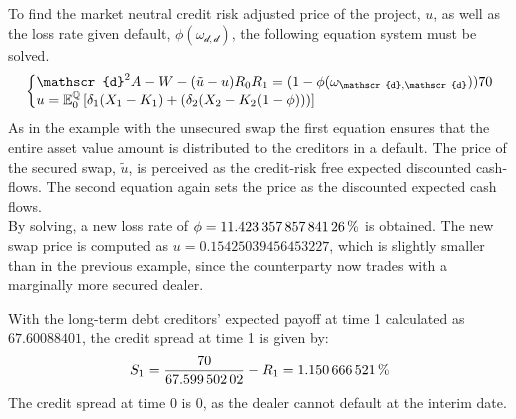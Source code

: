 \documentclass[main.tex]{subfiles}
\begin{document}
            To find the market neutral credit risk adjusted price of the project, $u$, 
            as well as the loss rate given default, $\phi(\omega_{\mathscr{d},\mathscr{d}})$,
            the following equation system must be solved.
            \begin{equation}
                \left\{\begin{array}{@{}l@{}}
                    \mathscr{d}^{2} A - W - (\tilde{u}-u)R_{0}R_{1}
                    =
                    (1-\phi(\omega_{\mathscr{d},\mathscr{d}}))\num{70}
                    \\
                    u =
                    \mathbb{E}_{0}^{\rnmeasure}\left[
                        \delta_{1}(X_1-K_1)+(\delta_{2}(X_2-K_2(1-\phi)))
                    \right]
                \end{array}\right.
            \end{equation}
            As in the example with the unsecured swap the first equation ensures
            that the entire asset value amount is distributed to the creditors in a default.
            The price of the secured swap, $\tilde{u}$, is perceived as the credit-risk free expected discounted cash-flows.
            The second equation again sets the price as the discounted expected cash flows.
            \\
            By solving, a new loss rate of $\phi = \pct{0.11423357857841265}$ is obtained.
            The new swap price is computed as $u=\num{0.15425039456453227}$,
            which is slightly smaller than in the previous example,
            since the counterparty now trades with a marginally more secured dealer.

            With the long-term debt creditors' expected payoff at time 1 calculated as $\num{67.60088401}$,
            the credit spread at time 1 is given by:
            \begin{equation}
                S_1 =
                \frac{
                    \num{70}
                }{
                    \num{67.59950202}
                }
                - R_{1}
                \nonumber
                = \pct{0.01150666521}
            \end{equation}
            The credit spread at time 0 is 0,
            as the dealer cannot default at the interim date.
            
\end{document}
